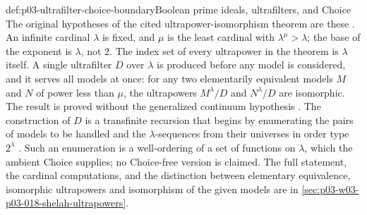 \begin{proofboundary}{def:p03-ultrafilter-choice-boundary}{Boolean prime ideals, ultrafilters, and Choice}
The original hypotheses of the cited ultrapower-isomorphism theorem are
these \cite[224--225]{Shelah1971Ultrapowers}.  An infinite cardinal
\(\lambda\) is fixed, and \(\mu\) is the least cardinal with
\(\lambda^\mu>\lambda\); the base of the exponent is \(\lambda\), not \(2\).
The index set of every ultrapower in the theorem is \(\lambda\) itself.  A
single ultrafilter \(D\) over \(\lambda\) is produced before any model is
considered, and it serves all models at once: for any two elementarily
equivalent models \(M\) and \(N\) of power less than \(\mu\), the ultrapowers
\(M^\lambda/D\) and \(N^\lambda/D\) are isomorphic.  The result is proved
without the generalized continuum hypothesis \cite[224]{Shelah1971Ultrapowers}.
The construction of \(D\) is a
transfinite recursion that begins by enumerating the pairs of models to be
handled and the \(\lambda\)-sequences from their universes in order type
\(2^\lambda\) \cite[230]{Shelah1971Ultrapowers}.  Such an enumeration is a
well-ordering of a set of functions on \(\lambda\), which the ambient Choice
supplies; no Choice-free version is claimed.  The full statement, the
cardinal computations, and the distinction between elementary equivalence,
isomorphic ultrapowers and isomorphism of the given models are in
\cref{sec:p03-w03-p03-018-shelah-ultrapowers}.


\end{proofboundary}
